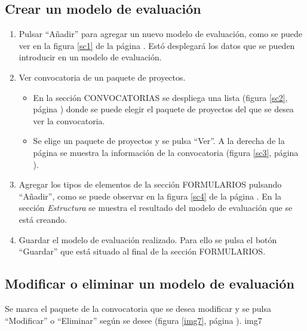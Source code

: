 \documentclass[11pt,a4paper,spanish,twoside]{book}
\begin{document}
\subsection{Crear un modelo de evaluación}
\begin{enumerate}
\item Pulsar ``Añadir'' para agregar un nuevo modelo de evaluación, como se 
  puede ver en la figura \ref{sc1} de la página \pageref{sc1}. Estó
  desplegará los datos que se pueden introducir en un modelo de evaluación.
  

\item Ver convocatoria de un paquete de proyectos.
  \begin{itemize}
  \item En la sección CONVOCATORIAS se despliega una lista (figura
    \ref{sc2}, página \pageref{sc2}) donde se puede elegir el paquete de
    proyectos del que se desea ver la convocatoria.


  \item Se elige un paquete de proyectos y se pulsa ``Ver''. A la derecha de la 
    página se muestra la información de la convocatoria (figura \ref{sc3},
    página \pageref{sc3}).

  \end{itemize}

\item Agregar los tipos de elementos de la sección FORMULARIOS pulsando 
  ``Añadir'', como se puede observar en la figura \ref{sc4} de la página
  \pageref{sc4}. En la sección 
  \emph{Estructura} se muestra el resultado del modelo de evaluación que se
  está creando.


\item Guardar el modelo de evaluación realizado. Para ello se pulsa el botón 
  ``Guardar'' que está situado al final de la sección FORMULARIOS.
\end{enumerate}

\subsection{Modificar o eliminar un modelo de evaluación}
Se marca el paquete de la convocatoria que se desea modificar y se pulsa 
``Modificar'' o ``Eliminar'' según se desee (figura \ref{img7}, página
\pageref{img7}).
{img7}
\end{document}
